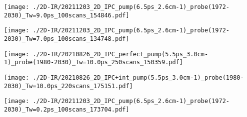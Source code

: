 \begin{frame}
	\texttt{[image: ./2D-IR/20211203\_2D\_IPC\_pump(6.5ps\_2.6cm-1)\_probe(1972-2030)\_Tw=9.0ps\_100scans\_154846.pdf]}
\end{frame}
\begin{frame}
	\texttt{[image: ./2D-IR/20211203\_2D\_IPC\_pump(6.5ps\_2.6cm-1)\_probe(1972-2030)\_Tw=7.0ps\_100scans\_134748.pdf]}
\end{frame}
\begin{frame}
	\texttt{[image: ./2D-IR/20210826\_2D\_IPC\_perfect\_pump(5.5ps\_3.0cm-1)\_probe(1980-2030)\_Tw=10.0ps\_250scans\_150359.pdf]}
\end{frame}
\begin{frame}
	\texttt{[image: ./2D-IR/20210826\_2D\_IPC+int\_pump(5.5ps\_3.0cm-1)\_probe(1980-2030)\_Tw=10.0ps\_220scans\_175151.pdf]}
\end{frame}
\begin{frame}
	\texttt{[image: ./2D-IR/20211203\_2D\_IPC\_pump(6.5ps\_2.6cm-1)\_probe(1972-2030)\_Tw=0.2ps\_100scans\_173704.pdf]}
\end{frame}
